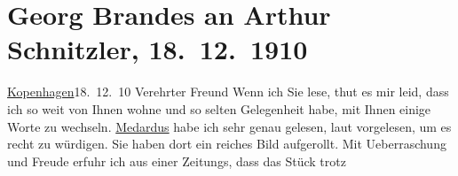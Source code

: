 

         
         \renewcommand{\erwaehntePersonen}{Personen: Richard Beer-Hofmann, Johann Wolfgang von Goethe, Heinrich von Kleist}
         \renewcommand{\erwaehnteOrte}{Orte: Deutschland, Kopenhagen, Wien}
         \renewcommand{\erwaehnteWerke}{Werke: Der junge Medardus. Dramatische Historie in einem Vorspiel und fünf Aufzügen, Tagebücher}
               \section[Georg Brandes an Arthur Schnitzler, 18. 12. 1910]{ Georg Brandes an Arthur Schnitzler, 18. 12. 1910}\nopagebreak{}\rehead{ }\begin{ledgroupsized}[t]{13cm}\normalsize\beginnumbering \toendnotes[C]{\smallbreak\pagebreak[2]} 
\toendnotes[C]{\smallbreak}\pstart
           \raggedleft{}{\pb}\uline{Kopenhagen}18. 12. 10\pend
           \pstart{}Verehrter Freund\pend\pstart
           Wenn ich Sie lese, thut es mir leid, dass ich so weit von Ihnen wohne und so selten
               Gelegenheit habe, mit Ihnen einige Worte zu wechseln.\pend
           \pstart
           \uline{Medardus} habe ich sehr genau gelesen, laut vorgelesen, um es recht zu würdigen. Sie
               haben dort ein reiches Bild aufgerollt. Mit Ueberraschung und Freude erfuhr ich aus
               einer Zeitungs\label{K_L01991-1v}\label{K_L01991-1h}, dass das Stück trotz

\end{ledgroupsized}
